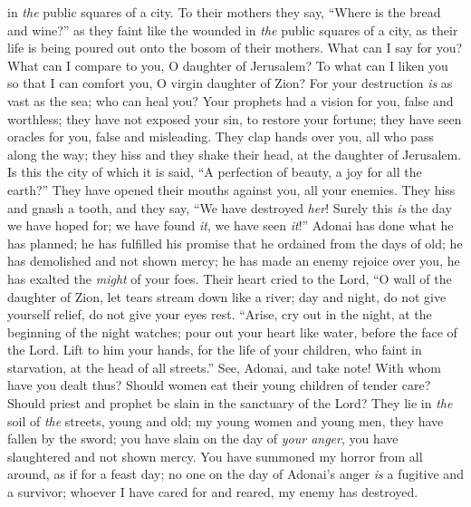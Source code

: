 \begin{biblechapter}
in \textit{the} public squares of a city.
\verse To their mothers they say, 
“Where is the bread and wine?” 
as they faint like the wounded 
in \textit{the} public squares of a city, 
as their life is being poured out 
onto the bosom of their mothers.
\verse What can I say for you? What can I compare to you, 
O daughter of Jerusalem? 
To what can I liken you so that I can comfort you, 
O virgin daughter of Zion? 
For your destruction \textit{is} as vast as the sea; 
who can heal you?
\verse Your prophets had a vision for you, 
false and worthless; 
they have not exposed your sin, 
to restore your fortune; 
they have seen oracles for you, 
false and misleading.
\verse They clap hands over you, 
all who pass along the way; 
they hiss and they shake their head, 
at the daughter of Jerusalem. 
Is this the city of which it is said, 
“A perfection of beauty, a joy for all the earth?”
\verse They have opened their mouths against you, 
all your enemies. 
They hiss and gnash a tooth, 
and they say, “We have destroyed \textit{her}! 
Surely this \textit{is} the day we have hoped for; 
we have found \textit{it}, we have seen \textit{it}!”
\verse Adonai has done what he has planned; 
he has fulfilled his promise 
that he ordained from the days of old; 
he has demolished and not shown mercy; 
he has made an enemy rejoice over you, 
he has exalted the \textit{might} of your foes.
\verse Their heart cried to the Lord, 
“O wall of the daughter of Zion, 
let tears stream down like a river; 
day and night, 
do not give yourself relief, 
do not give your eyes rest.
\verse “Arise, cry out in the night, 
at the beginning of the night watches; 
pour out your heart like water, 
before the face of the Lord. 
Lift to him your hands, 
for the life of your children, 
who faint in starvation, 
at the head of all streets.”
\verse See, Adonai, and take note! 
With whom have you dealt thus? 
Should women eat their young 
children of tender care? 
Should priest and prophet be slain 
in the sanctuary of the Lord?
\verse They lie in \textit{the} soil of \textit{the} streets, 
young and old; 
my young women and young men, 
they have fallen by the sword; 
you have slain on the day of \textit{your anger}, 
you have slaughtered and not shown mercy.
\verse You have summoned my horror from all around, 
as if for a feast day; 
no one on the day of Adonai’s anger 
\textit{is} a fugitive and a survivor; 
whoever I have cared for and reared, 
my enemy has destroyed.
\end{biblechapter}

